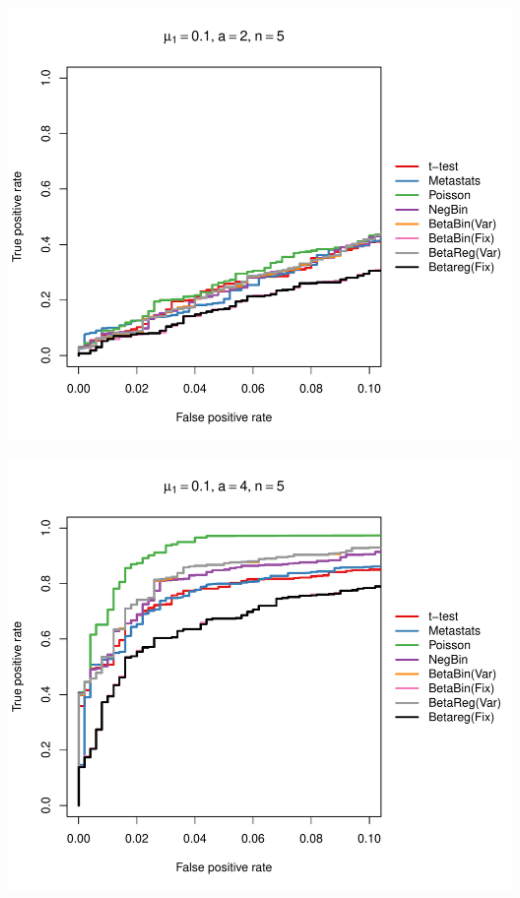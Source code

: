 \documentclass[12pt]{article}\usepackage{graphicx, color}
\makeatletter
\def\maxwidth{ %
  \ifdim\Gin@nat@width>\linewidth
    \linewidth
  \else
    \Gin@nat@width
  \fi
}
\newenvironment{knitrout}{}{} %
\makeatother
\begin{document}
\begin{knitrout}
{\centering \includegraphics[width=\maxwidth]{figure/rocs41} 

}




{\centering \includegraphics[width=\maxwidth]{figure/rocs42} 

}





\end{knitrout}
\end{document}

